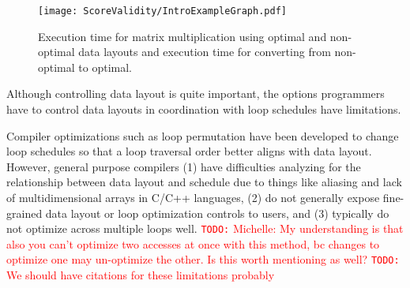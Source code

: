 \documentclass[sigconf, table]{acmart}
\newcommand{\todo}[1]{{\textcolor{red}{{\tt{TODO:}}\,\,#1 }}}
\begin{document}
\begin{figure}
	\texttt{[image: ScoreValidity/IntroExampleGraph.pdf]}
	\caption{Execution time for matrix multiplication using optimal and non-optimal data layouts and execution time for converting from non-optimal to optimal.}
	\label{IntroExample}
\end{figure}




Although controlling data layout is quite important, the options programmers have to control
data layouts in coordination with loop schedules have limitations.

Compiler optimizations such as loop permutation have been developed to change loop
schedules so that a loop traversal order better aligns with data layout.
However, general purpose compilers (1) have difficulties analyzing for the relationship between
data layout and schedule due to things like aliasing and lack of multidimensional arrays in 
C/C++ languages, (2) do not generally expose fine-grained data layout or loop optimization
controls to users, and (3) typically do not optimize across multiple loops well.
\todo{Michelle: My understanding is that also you can't optimize two accesses at once with this method, bc changes to optimize one may un-optimize the other. Is this worth mentioning as well?}
\todo{We should have citations for these limitations probably}
\end{document}
